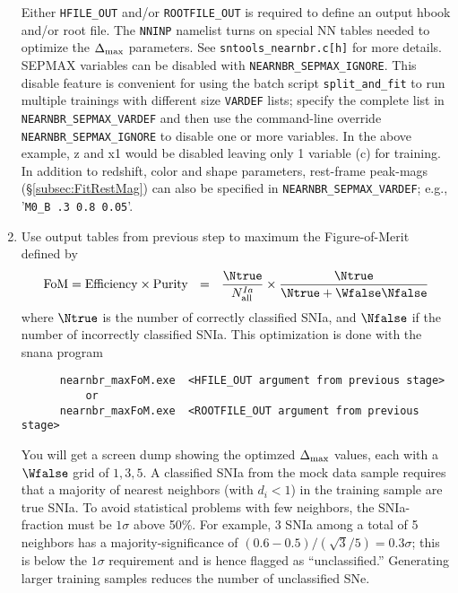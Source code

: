 \documentclass[12pt]{article}
\begin{document}
\begin{enumerate}
       Either {\tt HFILE\_OUT} and/or {\tt ROOTFILE\_OUT} is
       required to define an output hbook and/or root file. 
       The {\tt NNINP} namelist
       turns on special NN tables needed to optimize the
       $\Delta_{\rm max}$ parameters. 
       See {\tt sntools\_nearnbr.c[h]} for more details.
       SEPMAX variables can be disabled with {\tt NEARNBR\_SEPMAX\_IGNORE}.
       This disable feature is convenient for using the batch script 
       {\tt split\_and\_fit} to run multiple trainings with different size 
       {\tt VARDEF} lists;
       specify the complete list in {\tt NEARNBR\_SEPMAX\_VARDEF} and
       then use the command-line override {\tt NEARNBR\_SEPMAX\_IGNORE}
       to disable one or more variables. In the above example,
       z and x1 would be disabled leaving only 1 variable (c) for
       training.  In addition to redshift, color and shape parameters,
       rest-frame peak-mags (\S\ref{subsec:FitRestMag})
       can also be specified in {\tt NEARNBR\_SEPMAX\_VARDEF};
       e.g., '{\tt M0\_B .3 0.8 0.05}'.
%
 \item  Use output tables from previous step to maximum 
        the Figure-of-Merit defined by
    \begin{equation}
       {\rm FoM} = {\rm Efficiency} \times {\rm Purity}~~ = ~~
           \frac{\Ntrue}{N_{\rm all}^{Ia}} \times
           \frac{\Ntrue}{ \Ntrue + \Wfalse\Nfalse}
    \end{equation}
     where $\Ntrue$ is the number of correctly classified SNIa,
     and $\Nfalse$ if the number of incorrectly classified SNIa.
     This optimization is done with the snana program
     \begin{verbatim}
      nearnbr_maxFoM.exe  <HFILE_OUT argument from previous stage>
          or
      nearnbr_maxFoM.exe  <ROOTFILE_OUT argument from previous stage>
     \end{verbatim}
     You will get a screen dump showing the optimzed $\Delta_{\rm max}$
     values, each with a $\Wfalse$ grid of $1,3,5$.
     A classified SNIa from the mock data sample requires that a
     majority of nearest neighbors (with $d_i<1$) in the training
     sample are true SNIa. To avoid statistical problems with
     few neighbors, the SNIa-fraction must be $1\sigma$ above
     50\%. For example, 3 SNIa among a total of 5 neighbors
     has a majority-significance of $(0.6-0.5)/(\sqrt{3}/5) = 0.3\sigma$;
     this is below the $1\sigma$ requirement and is hence flagged as
     ``unclassified.''  Generating larger training samples reduces
     the number of unclassified SNe.

\end{enumerate}
\end{document}
